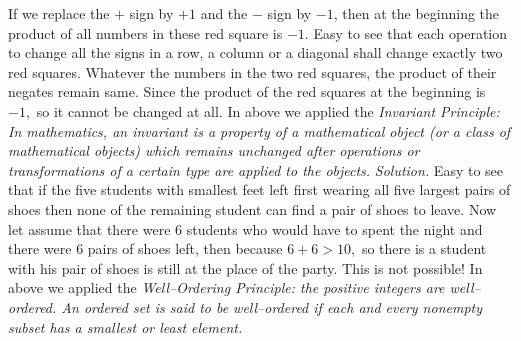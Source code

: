 \begin{multicols}{2}
\begin{center}
	\end{center}	
	If we replace the $+$ sign by $+1$ and the $-$ sign by $-1$, then at the beginning the product of all numbers in these red square is $-1.$ 
	Easy to see that each operation to change all the signs in a row, a column or a diagonal shall change exactly two red squares.
	Whatever the numbers in the two red squares, the product of their negates remain same.
	Since the product of the red squares at the beginning is $-1,$ so it cannot be changed at all.
	\vskip 0.1cm
	In above we applied the \textit{Invariant Principle: In mathematics, an invariant is a property of a mathematical object
	(or a class of mathematical objects) which remains unchanged after operations or transformations of a certain type are applied to the objects.} 
	\vskip 0.2cm
	\vskip 0.2cm
	\textit{Solution.}
	Easy to see that if the five students with smallest feet left first wearing all five largest pairs of shoes
	then none of the remaining student can find a pair of shoes to leave.
	Now let assume that there were $6$ students who would have to spent the night and there were $6$ pairs of shoes left,
	then because $6 + 6 > 10,$ so there is a student with his pair of shoes is still at the place of the party. This is not possible!
	\vskip 0.1cm
	In above we applied the \textit{Well--Ordering Principle: the positive integers are well--ordered.
	An ordered set is said to be well--ordered if each and every nonempty subset has a smallest or least element.} 
	\vskip 0.2cm
\end{multicols}
